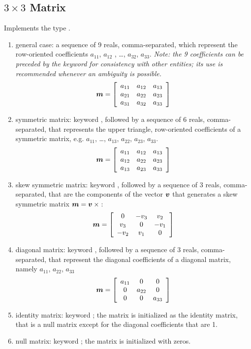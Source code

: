 \subsection{$3 \times 3$ Matrix}
\label{sec:Mat3x3}
Implements the type .
\begin{enumerate}
    \item general case: a sequence of 9 reals, comma-separated, which
    represent the row-oriented coefficients $ a_{11} $, $ a_{12}$ ,
    \ldots, $ a_{32} $, $ a_{33} $.
    \emph{Note: the 9 coefficients can be preceded by the keyword
     for consistency with other entities; its use is recommended
    whenever an ambiguity is possible.}
\begin{equation}
	\T{m} = \sqbr{\matr{ccc}{
		a_{11} & a_{12} & a_{13} \\
		a_{21} & a_{22} & a_{23} \\
		a_{31} & a_{32} & a_{33}
	}}
\end{equation}
    \item symmetric matrix: keyword , followed by a sequence
    of 6 reals, comma-separated, that represents the upper triangle, 
    row-oriented coefficients of a symmetric matrix, 
    e.g. $ a_{11} $, \ldots , $ a_{13} $, $ a_{22} $, $ a_{23} $, $ a_{33} $.
\begin{equation}
	\T{m} = \sqbr{\matr{ccc}{
		a_{11} & a_{12} & a_{13} \\
		a_{12} & a_{22} & a_{23} \\
		a_{13} & a_{23} & a_{33}
	}}
\end{equation}
    \item skew symmetric matrix: keyword , followed by a sequence
    of 3 reals, comma-separated, that are the components of the vector $\T{v}$
    that generates a skew symmetric matrix $\T{m}=\T{v}\times{}$:
\begin{equation}
	\T{m} = \sqbr{\matr{ccc}{
		0 & -v_3 & v_2 \\
		v_3 & 0 & -v_1 \\
		-v_2 & v_1 & 0
	}}
\end{equation}
    \item diagonal matrix: keyword , followed by a sequence
    of 3 reals, comma-separated, that represent the diagonal coefficients 
    of a diagonal matrix, namely $a_{11}$, $a_{22}$, $a_{33}$
\begin{equation}
	\T{m} = \sqbr{\matr{ccc}{
		a_{11} & 0 & 0 \\
		0 & a_{22} & 0 \\
		0 & 0 & a_{33}
	}}
\end{equation}
    \item identity matrix: keyword ; the matrix is initialized
    as the identity matrix, that is a null matrix except for the diagonal 
    coefficients that are 1.
    \item null matrix: keyword ; the matrix is initialized 
    with zeros.
\end{enumerate}
